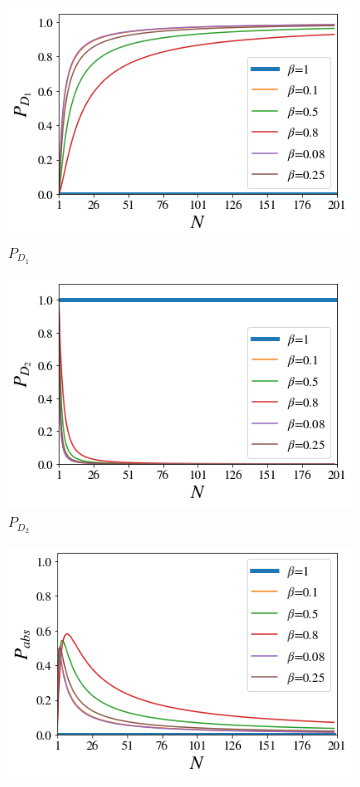 \documentclass[12pt]{book}
\begin{document}
 \begin{figure}[!t]
\centering
\begin{subfigure}[b]{0.45\linewidth}
\includegraphics[width=\linewidth]{images/ChopperD1.png}
\caption{$P_{D_{1}}$}
\label{fig:BS1}
\end{subfigure}
\begin{subfigure}[b]{0.45\linewidth}
\includegraphics[width=\linewidth]{images/ChopperD2.png}
\caption{$P_{D_{2}}$}
\label{fig:westminster_aerea}
\end{subfigure}
\begin{subfigure}[b]{0.45\linewidth}
\includegraphics[width=\linewidth]{images/Chopper_abs.png}

\end{subfigure}
\end{figure}
\end{document}

